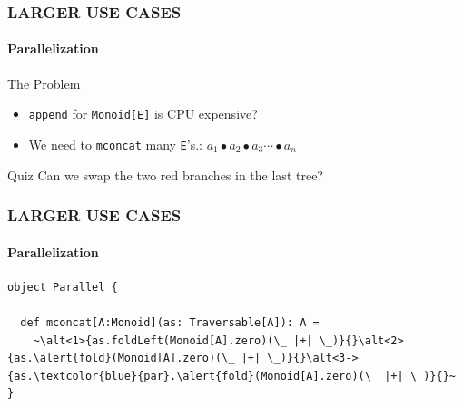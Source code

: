 \documentclass{beamer}
\begin{document}
\begin{frame} \frametitle{LARGER USE CASES}
  \framesubtitle{Parallelization}
  \begin{block}{The Problem}
    \begin{itemize}
      \item \texttt{append} for \texttt{Monoid[E]} is CPU expensive?
      \item We need to \texttt{mconcat} many \texttt{E}'s.: \(a_1 \bullet a_2 \bullet a_3 \dotsb \bullet a_n\)
    \end{itemize}
  \end{block}

\pause


\begin{block}{Quiz}
  Can we swap the two red branches in the last tree?
\end{block}
\end{frame}

\begin{frame}[fragile] \frametitle{LARGER USE CASES}
  \framesubtitle{Parallelization}

  \begin{block}{}
  \begin{lstlisting}
object Parallel {

  def mconcat[A:Monoid](as: Traversable[A]): A =
    ~\alt<1>{as.foldLeft(Monoid[A].zero)(\_ |+| \_)}{}\alt<2>{as.\alert{fold}(Monoid[A].zero)(\_ |+| \_)}{}\alt<3->{as.\textcolor{blue}{par}.\alert{fold}(Monoid[A].zero)(\_ |+| \_)}{}~
}
  \end{lstlisting}
  \end{block}

\end{frame}
\end{document}

